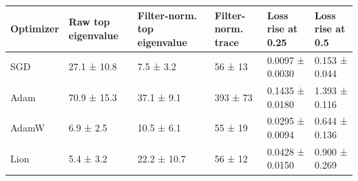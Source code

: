 \begin{tabular}{llllll}
\toprule
Optimizer & Raw top eigenvalue & Filter-norm. top eigenvalue & Filter-norm. trace & Loss rise at 0.25 & Loss rise at 0.5 \\
\midrule
SGD & 27.1 ± 10.8 & 7.5 ± 3.2 & 56 ± 13 & 0.0097 ± 0.0030 & 0.153 ± 0.044 \\
Adam & 70.9 ± 15.3 & 37.1 ± 9.1 & 393 ± 73 & 0.1435 ± 0.0180 & 1.393 ± 0.116 \\
AdamW & 6.9 ± 2.5 & 10.5 ± 6.1 & 55 ± 19 & 0.0295 ± 0.0094 & 0.644 ± 0.136 \\
Lion & 5.4 ± 3.2 & 22.2 ± 10.7 & 56 ± 12 & 0.0428 ± 0.0150 & 0.900 ± 0.269 \\
\bottomrule
\end{tabular}
